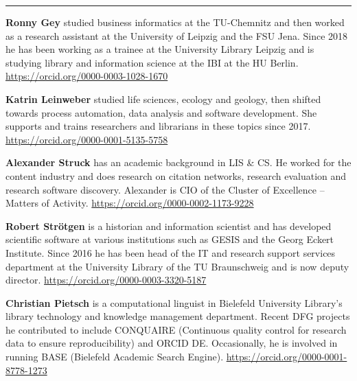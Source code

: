 \begin{center}\rule{0.5\linewidth}{0.5pt}\end{center}

\textbf{Ronny Gey} studied business informatics at the TU-Chemnitz and
then worked as a research assistant at the University of Leipzig and the
FSU Jena. Since 2018 he has been working as a trainee at the University
Library Leipzig and is studying library and information science at the
IBI at the HU Berlin. \url{https://orcid.org/0000-0003-1028-1670}

\textbf{Katrin Leinweber} studied life sciences, ecology and geology,
then shifted towards process automation, data analysis and software
development. She supports and trains researchers and librarians in these
topics since 2017. \url{https://orcid.org/0000-0001-5135-5758}

\textbf{Alexander Struck} has an academic background in LIS \& CS. He
worked for the content industry and does research on citation networks,
research evaluation and research software discovery. Alexander is CIO of
the Cluster of Excellence -- Matters of Activity.
\url{https://orcid.org/0000-0002-1173-9228}

\textbf{Robert Strötgen} is a historian and information scientist and
has developed scientific software at various institutions such as GESIS
and the Georg Eckert Institute. Since 2016 he has been head of the IT
and research support services department at the University Library of
the TU Braunschweig and is now deputy director.
\url{https://orcid.org/0000-0003-3320-5187}

\textbf{Christian Pietsch} is a computational linguist in Bielefeld
University Library's library technology and knowledge management
department. Recent DFG projects he contributed to include CONQUAIRE
(Continuous quality control for research data to ensure reproducibility)
and ORCID DE. Occasionally, he is involved in running BASE (Bielefeld
Academic Search Engine). \url{https://orcid.org/0000-0001-8778-1273}
